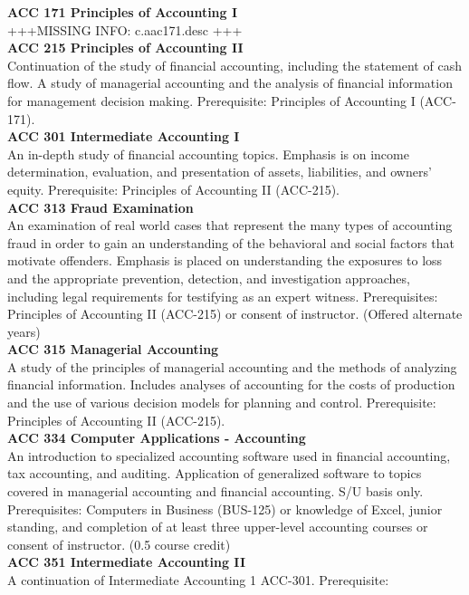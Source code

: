 \documentclass[
  letterpaper,
]{scrbook}
\begin{document}
\textbf{ACC 171 Principles of Accounting I}\\
+++MISSING INFO: c.aac171.desc +++\\
\textbf{ACC 215 Principles of Accounting II}\\
Continuation of the study of financial accounting, including the
statement of cash flow. A study of managerial accounting and the
analysis of financial information for management decision making.
Prerequisite: Principles of Accounting I (ACC-171).\\
\textbf{ACC 301 Intermediate Accounting I}\\
An in-depth study of financial accounting topics. Emphasis is on income
determination, evaluation, and presentation of assets, liabilities, and
owners' equity. Prerequisite: Principles of Accounting II (ACC-215).\\
\textbf{ACC 313 Fraud Examination}\\
An examination of real world cases that represent the many types of
accounting fraud in order to gain an understanding of the behavioral and
social factors that motivate offenders. Emphasis is placed on
understanding the exposures to loss and the appropriate prevention,
detection, and investigation approaches, including legal requirements
for testifying as an expert witness. Prerequisites: Principles of
Accounting II (ACC-215) or consent of instructor. (Offered alternate
years)\\
\textbf{ACC 315 Managerial Accounting}\\
A study of the principles of managerial accounting and the methods of
analyzing financial information. Includes analyses of accounting for the
costs of production and the use of various decision models for planning
and control. Prerequisite: Principles of Accounting II (ACC-215).\\
\textbf{ACC 334 Computer Applications - Accounting}\\
An introduction to specialized accounting software used in financial
accounting, tax accounting, and auditing. Application of generalized
software to topics covered in managerial accounting and financial
accounting. S/U basis only. Prerequisites: Computers in Business
(BUS-125) or knowledge of Excel, junior standing, and completion of at
least three upper-level accounting courses or consent of instructor.
(0.5 course credit)\\
\textbf{ACC 351 Intermediate Accounting II}\\
A continuation of Intermediate Accounting 1 ACC-301. Prerequisite:
\end{document}
